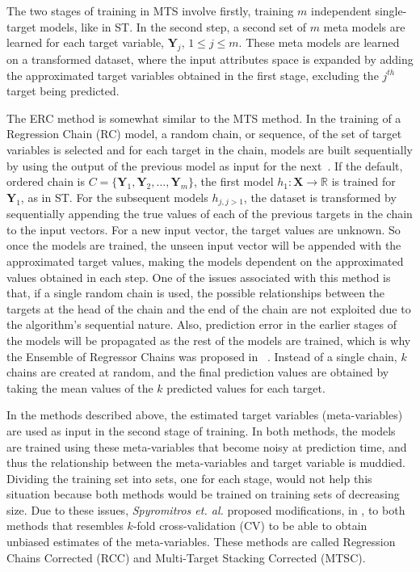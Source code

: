 \documentclass[reqno]{vcuthesis}
\numberwithin{equation}{chapter}
\begin{document}
The two stages of training in MTS involve firstly, training $m$ independent single-target models, like in ST. In the second step, a second set of $m$ meta models are learned for each target variable, $\bm{Y}_j,\, 1 \leq j \leq m$. These meta models are learned on a transformed dataset, where the input attributes space is expanded by adding the approximated target variables obtained in the first stage, excluding the $j^{th}$ target being predicted.

The ERC method is somewhat similar to the MTS method. In the training of a Regression Chain (RC) model, a random chain, or sequence, of the set of target variables is selected and for each target in the chain, models are built sequentially by using the output of the previous model as input for the next~\cite{Xioufis2016}. If the default, ordered chain is $C = \{\bm Y_1, \bm Y_2, \ldots, \bm Y_m\}$, the first model $h_1 : \bm X \rightarrow \mathbb{R}$ is trained for $\bm Y_1$, as in ST. For the subsequent models $h_{j,j>1}$, the dataset is transformed by sequentially appending the true values of each of the previous targets in the chain to the input vectors. For a new input vector, the target values are unknown. So once the models are trained, the unseen input vector will be appended with the approximated target values, making the models dependent on the approximated values obtained in each step. One of the issues associated with this method is that, if a single random chain is used, the possible relationships between the targets at the head of the chain and the end of the chain are not exploited due to the algorithm's sequential nature. Also, prediction error in the earlier stages of the models will be propagated as the rest of the models are trained, which is why the Ensemble of Regressor Chains was proposed in ~\cite{Spyromitros2014}. Instead of a single chain, $k$ chains are created at random, and the final prediction values are obtained by taking the mean values of the $k$ predicted values for each target. 

In the methods described above, the estimated target variables (meta-variables) are used as input in the second stage of training. In both methods, the models are trained using these meta-variables that become noisy at prediction time, and thus the relationship between the meta-variables and target variable is muddied. Dividing the training set into sets, one for each stage, would not help this situation because both methods would be trained on training sets of decreasing size. Due to these issues, \textit{Spyromitros et. al.} proposed modifications, in \cite{Spyromitros2014}, to both methods that resembles $k$-fold cross-validation (CV) to be able to obtain unbiased estimates of the meta-variables. These methods are called Regression Chains Corrected (RCC) and Multi-Target Stacking Corrected (MTSC). 
\end{document}
